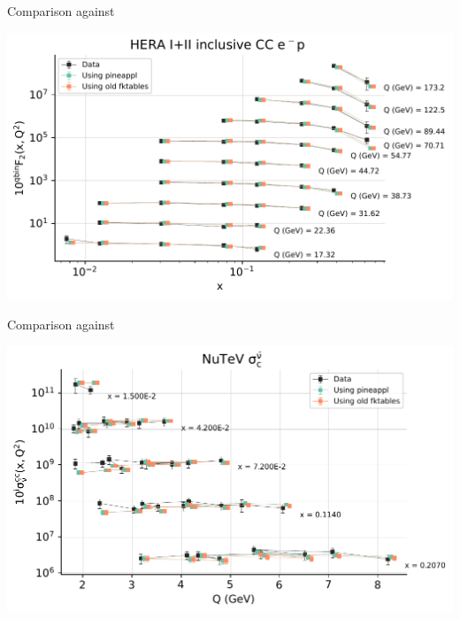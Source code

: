 \documentclass[9pt]{beamer}
\begin{document}
\begin{frame}{Comparison \yadism{} against \apfel{}}
	\begin{center}
		\includegraphics[width=\linewidth]{matched_datasets_from_dataspecs4_dataset_report_plot_fancy_dataspecs_0.pdf}
	\end{center}
\end{frame}
\begin{frame}{Comparison \yadism{} against \apfel{}}
	\begin{center}
		\includegraphics[width=\linewidth]{matched_datasets_from_dataspecs6_dataset_report_plot_fancy_dataspecs_0.pdf}
	\end{center}
\end{frame}
\end{document}
